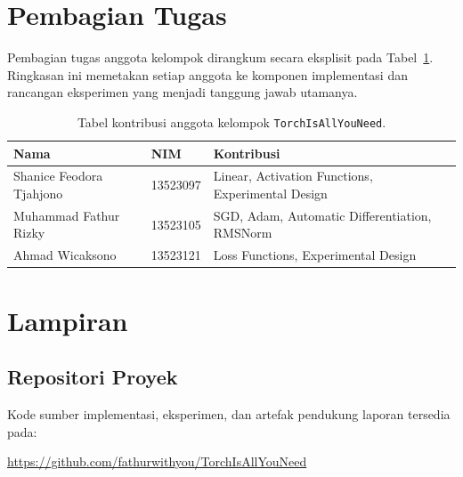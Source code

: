 \documentclass{article}
\begin{document}
\section{Pembagian Tugas}
Pembagian tugas anggota kelompok dirangkum secara eksplisit pada Tabel~\ref{tab:kontribusi}. Ringkasan ini memetakan setiap anggota ke komponen implementasi dan rancangan eksperimen yang menjadi tanggung jawab utamanya.
\begin{table}[!tbp]
\begin{center}
\caption{Tabel kontribusi anggota kelompok \texttt{TorchIsAllYouNeed}.}
\label{tab:kontribusi}
\begin{tabularx}{\linewidth}{llX}
\toprule
\textbf{Nama} & \textbf{NIM} & \textbf{Kontribusi} \\
\midrule
Shanice Feodora Tjahjono & 13523097 & Linear, Activation Functions, Experimental Design \\
Muhammad Fathur Rizky & 13523105 & SGD, Adam, Automatic Differentiation, RMSNorm \\
Ahmad Wicaksono & 13523121 & Loss Functions, Experimental Design \\
\bottomrule
\end{tabularx}
\end{center}
\end{table}

\section{Lampiran}
\subsection{Repositori Proyek}
Kode sumber implementasi, eksperimen, dan artefak pendukung laporan tersedia pada:
\begin{center}
\url{https://github.com/fathurwithyou/TorchIsAllYouNeed}
\end{center}
\end{document}
